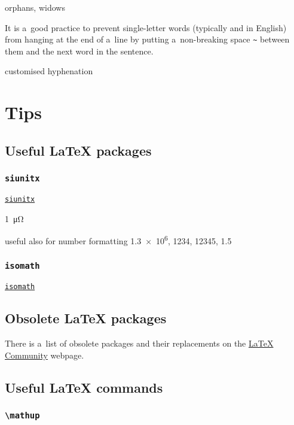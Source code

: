 \documentclass[12pt,a4paper]{article}
\begin{document}
orphans, widows

It is a~good practice to prevent single-letter words (typically  and  in English) from hanging at the end of a~line by putting a~non-breaking space \verb!~! between them and the next word in the sentence.

customised hyphenation

\section{Tips}

\cite{vieth-experience}
\cite{latex-short,latex-tabu,latex-tips,latex-dos-donts,latex-wikibook}

\subsection{Useful \LaTeX{} packages}

\subsubsection{\texttt{siunitx}}

\href{https://ctan.org/pkg/siunitx}{\texttt{siunitx}}

\SI{1}{\micro\ohm}

useful also for number formatting \num{1.3e6}, \num{1234}, \num{12345}, \num{1,5}

\subsubsection{\texttt{isomath}}

\href{https://ctan.org/pkg/isomath}{\texttt{isomath}}

\subsection{Obsolete \LaTeX{} packages}

There is a~list of obsolete packages and their replacements on the \href{https://latex.org/forum/viewtopic.php?t=6637}{\LaTeX{} Community} webpage.

\subsection{Useful \LaTeX{} commands}

\cprotect\subsubsection{\verb_\mathup_}
\label{sec:mathup}
\end{document}
